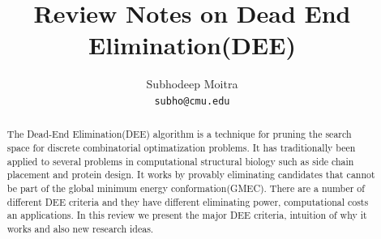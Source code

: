 \documentclass{article}
\begin{document}
\title{Review Notes on Dead End Elimination(DEE)}

\author{Subhodeep Moitra \\ {\tt subho@cmu.edu}}

\maketitle

\begin{abstract}
The Dead-End Elimination(DEE) algorithm is a technique for pruning the search space for discrete combinatorial optimatization problems. It has traditionally been applied to several problems in computational structural biology such as side chain placement and protein design. It works by provably eliminating candidates that cannot be part of the global minimum energy conformation(GMEC). There are a number of different DEE criteria and they have different eliminating power, computational costs an applications. In this review we present the major DEE criteria, intuition of why it works and also new research ideas. 
\end{abstract}
\end{document}
